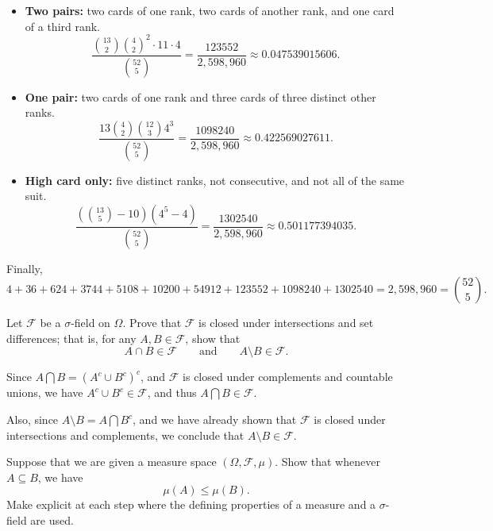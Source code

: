 \documentclass[11pt]{article}
\begin{document}
\begin{solution}
\begin{itemize}
\item \textbf{Two pairs:} two cards of one rank, two cards of another rank, and one card of a third rank.
\[
\frac{
\binom{13}{2}\binom{4}{2}^2\cdot 11\cdot 4
}{
\binom{52}{5}
}
=
\frac{123552}{2,598,960}
\approx 0.047539015606.
\]

\item \textbf{One pair:} two cards of one rank and three cards of three distinct other ranks.
\[
\frac{
13\binom{4}{2}\binom{12}{3}4^3
}{
\binom{52}{5}
}
=
\frac{1098240}{2,598,960}
\approx 0.422569027611.
\]

\item \textbf{High card only:} five distinct ranks, not consecutive, and not all of the same suit.
\[
\frac{
\left(\binom{13}{5}-10\right)(4^5-4)
}{
\binom{52}{5}
}
=
\frac{1302540}{2,598,960}
\approx 0.501177394035.
\]

\end{itemize}

Finally,
\[
4+36+624+3744+5108+10200+54912+123552+1098240+1302540
=
2,598,960
=
\binom{52}{5}.
\]

\end{solution}

\begin{problem}[10]
Let $\mathcal{F}$ be a $\sigma$-field on $\Omega$. Prove that $\mathcal{F}$ is closed under
intersections and set differences; that is, for any $A,B\in\mathcal{F}$, show that
\[
  A\cap B\in\mathcal{F}
  \qquad\text{and}\qquad
  A\setminus B\in\mathcal{F}.
\]
\end{problem}

\begin{solution}

  Since $A \bigcap B = (A^c \cup B^c)^c$, and $\mathcal{F}$ is closed under complements and countable unions, we have $A^c \cup B^c \in \mathcal{F}$, and thus $A \bigcap B \in \mathcal{F}$.

  Also, since $A \setminus B = A \bigcap B^c$, and we have already shown that $\mathcal{F}$ is closed under intersections and complements, we conclude that $A \setminus B \in \mathcal{F}$.
\end{solution}

\begin{problem}[10]
Suppose that we are given a measure space $(\Omega,\mathcal{F},\mu)$. Show that whenever
$A\subseteq B$, we have
\[
  \mu(A)\leq \mu(B).
\]
Make explicit at each step where the defining properties of a measure and a $\sigma$-field are used.
\end{problem}
\end{document}
